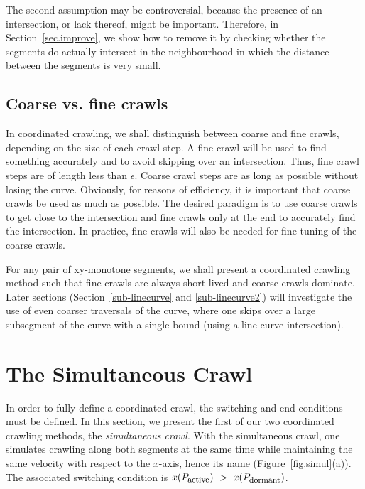 The second assumption may be controversial, because the presence of an 
intersection, or lack thereof, might be important.
Therefore, in Section~\ref{sec.improve}, we show how to remove it by checking whether the segments 
do actually intersect in the neighbourhood in which the distance between the segments is very 
small.  %

\subsection{Coarse vs. fine crawls}

In coordinated crawling, we shall distinguish between coarse and fine crawls, depending on
the size of each crawl step.
A fine crawl will be used to find something accurately and to avoid skipping over an intersection.
Thus, fine crawl steps are of length less than $\epsilon$.
Coarse crawl steps are as long as possible without losing the curve.
Obviously, for reasons of efficiency, it is important that coarse crawls be used as much as 
possible.
The desired paradigm is to use coarse crawls to get close to the intersection and 
fine crawls only at the end to accurately find the intersection.
In practice, fine crawls will also be needed for fine tuning of the coarse crawls.

For any pair of xy-monotone segments, we shall present a coordinated crawling method such 
that fine crawls are always short-lived and coarse crawls dominate.
Later sections (Section~\ref{sub-linecurve} and \ref{sub-linecurve2}) will investigate the use 
of even coarser traversals of the curve, where one skips over a large subsegment of the curve 
with a single bound (using a line-curve intersection).

\section{The Simultaneous Crawl}
\label{sec-simul}

In order to fully define a coordinated crawl, the switching and end conditions must be defined.
In this section, we present the first of our two coordinated crawling methods, the 
{\em simultaneous crawl}.
With the simultaneous crawl, one simulates crawling along both 
segments at the same time while maintaining the same velocity with respect to the $x$-axis,
hence its name (Figure~\ref{fig.simul}(a)).
The associated switching condition is 
$ x(P_{\mbox{\footnotesize{active}}})\ >\ x(P_{\mbox{\footnotesize{dormant}}}) $.

